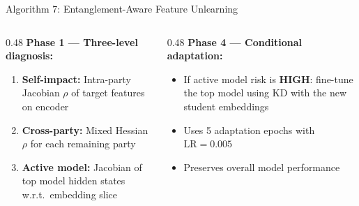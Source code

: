 \documentclass[aspectratio=169, 11pt]{beamer}
\begin{document}
\begin{frame}{Algorithm 7: Entanglement-Aware Feature Unlearning}
  \begin{center}
  \end{center}
  \vspace{0.2cm}
  \begin{columns}[T]
    \begin{column}{0.48\textwidth}
      \textbf{Phase 1 --- Three-level diagnosis:}
      \begin{enumerate}
        \item \textbf{Self-impact:} Intra-party Jacobian $\rho$ of target features on encoder
        \item \textbf{Cross-party:} Mixed Hessian $\rho$ for each remaining party
        \item \textbf{Active model:} Jacobian of top model hidden states w.r.t.\ embedding slice
      \end{enumerate}
    \end{column}
    \begin{column}{0.48\textwidth}
      \textbf{Phase 4 --- Conditional adaptation:}
      \begin{itemize}
        \item If active model risk is \textbf{HIGH}: fine-tune the top model using KD with the new student embeddings
        \item Uses 5 adaptation epochs with $\text{LR} = 0.005$
        \item Preserves overall model performance
      \end{itemize}
    \end{column}
  \end{columns}
\end{frame}
\end{document}
